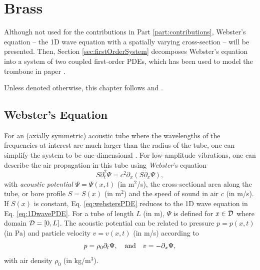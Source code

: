 \chapter{Brass}\label{ch:brass}



Although not used for the contributions in Part \ref{part:contributions}, Webster's equation -- the 1D wave equation with a spatially varying cross-section -- will be presented. Then, Section \ref{sec:firstOrderSystem} decomposes Webster's equation into a system of two coupled first-order PDEs, which has been used to model the trombone in paper \citeP[H].


Unless denoted otherwise, this chapter follows \cite{theBible} and \cite{Bilbao2018}.

\section{Webster's Equation}\label{sec:webstersEq}
For an (axially symmetric) acoustic tube where the wavelengths of the frequencies at interest are much larger than the radius of the tube, one can simplify the system to be one-dimensional \cite{Bilbao2018}. For low-amplitude vibrations, one can describe the air propagation in this tube using \textit{Webster}'s equation \cite{Webster1919}
\begin{equation}\label{eq:webstersPDE}
    S\partial_t^2\Psi = c^2\partial_x(S\partial_x\Psi),
\end{equation}
with \textit{acoustic potential} $\Psi = \Psi(x,t)$ (in m$^2$/s), the cross-sectional area along the tube, or bore profile $S = S(x)$ (in m$^2$) and the speed of sound in air $c$ (in m/s). If $S(x)$ is constant, Eq. \eqref{eq:webstersPDE} reduces to the 1D wave equation in Eq. \eqref{eq:1DwavePDE}. For a tube of length $L$ (in m), $\Psi$ is defined for $x \in \mathcal{D}$ where domain $\mathcal{D} = [0, L]$. The acoustic potential can be related to pressure $p = p(x,t)$ (in Pa) and particle velocity $v = v(x,t)$ (in m/s) according to \cite{Bilbao2018}
\begin{equation}\label{eq:pressureVelocityWebster}
    p = \rho_0 \partial_t \Psi, \quad \text{and} \quad v = -\partial_x \Psi,
\end{equation}
with air density $\rho_0$ (in kg/m$^3$).

